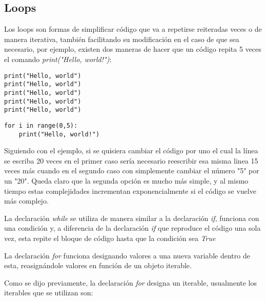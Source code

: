 \documentclass[10pt,a4paper]{article}
\begin{document}
\subsection{Loops}
Los loops son formas de simplificar código que va a repetirse reiteradas veces o de manera iterativa, también facilitando su modificación en el caso de que sea necesario, por ejemplo, existen dos maneras de hacer que un código repita 5 veces el comando \emph{print("Hello, world!")}:
\begin{multicols}{2}
\begin{lstlisting}
print("Hello, world")
print("Hello, world")
print("Hello, world")
print("Hello, world")
print("Hello, world")\end{lstlisting}
\vfill\null \columnbreak
\noindent
\begin{lstlisting}
for i in range(0,5):
    print("Hello, world!")\end{lstlisting}
\end{multicols}
\noindent Siguiendo con el ejemplo, si se quisiera cambiar el código por uno el cual la línea se escriba 20 veces en el primer caso sería necesario reescribir esa misma linea 15 veces más cuando en el segundo caso con simplemente cambiar el número "5" por un "20". Queda claro que la segunda opción es mucho más simple, y al mismo tiempo estas complejidades incrementan exponencialmente si el código se vuelve más complejo.
\begin{description}[
align=right,
labelindent=1cm,
labelsep=0.5cm,
itemindent=0cm]
\item [while] La declaración \emph{while} se utiliza de manera similar a la declaración \emph{if}, funciona con una condición y, a diferencia de la declaración \emph{if} que reproduce el código una sola vez, esta repite el bloque de código hasta que la condición sea \emph{True}
\item [for] La declaración \emph{for} funciona designando valores a una nueva variable dentro de esta, reasignándole valores en función de un objeto iterable.
\end{description}

\noindent Como se dijo previamente, la declaración \emph{for} designa un iterable, usualmente los iterables que se utilizan son:
\end{document}

